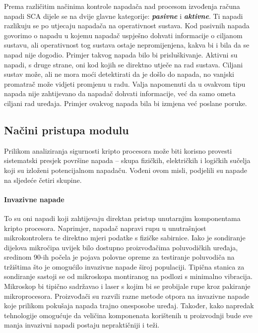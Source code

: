 \documentclass[times, utf8, diplomski]{fer}
\begin{document}
Prema različitim načinima kontrole napadača nad procesom izvođenja računa napadi SCA dijele se na dvije glavne kategorije: \textit{\textbf{pasivne}} i \textit{\textbf{aktivne}}. Ti napadi razlikuju se po utjecaju napadača na operativnost sustava. Kod pasivnih napada govorimo o napadu u kojemu napadač uspješno dohvati informacije o ciljanom sustavu, ali operativnost tog sustava ostaje nepromijenjena, kakva bi i bila da se napad nije dogodio. Primjer takvog napada bilo bi prisluškivanje. Aktivni su napadi, s druge strane, oni kod kojih se direktno utječe na rad sustava. Ciljani sustav može, ali ne mora moći detektirati da je došlo do napada, no vanjski promatrač može vidjeti promjenu u radu. Valja napomenuti da u ovakvom tipu napada nije zahtijevano da napadač dohvati informacije, već da samo ometa ciljani rad uređaja. Primjer ovakvog napada bila bi izmjena već poslane poruke.

\subsection{Načini pristupa modulu}

Prilikom analiziranja sigurnosti kripto procesora može biti korisno provesti sistematski presjek površine napada -- skupa fizičkih, električkih i logičkih sučelja koji su izloženi potencijalnom napadaču. Vođeni ovom misli, \cite{anderson2006cryptographic} podjelili su napade na sljedeće četiri skupine.

\paragraph{Invazivne napade }
To su oni napadi koji zahtijevaju direktan pristup unutarnjim komponentama kripto procesora. Naprimjer, napadač napravi rupu u unutrašnjost mikrokontrolera te direktno mjeri podatke s fizičke sabirnice. Iako je sondiranje dijelova mikročipa uvijek bilo dostupno proizvođačima poluvodičkih uređaja, sredinom 90-ih počela je pojava polovne opreme za testiranje poluvodiča na tržištima što je omogućilo invazivne napade široj populaciji. Tipična stanica za sondiranje sastoji se od mikroskopa montiranog na podlozi s minimalno vibracija. Mikroskop bi tipično sadržavao i laser s kojim bi se probijale rupe kroz pakiranje mikroprocesora. Proizvođači su razvili razne metode otpora na invazivne napade koje prilikom pokušaja napada trajno onesposobe uređaj. Također, kako napredak tehnologije omogućuje da veličina komponenata korištenih u proizvodnji bude sve manja invazivni napadi postaju nepraktičniji i teži.
\end{document}
